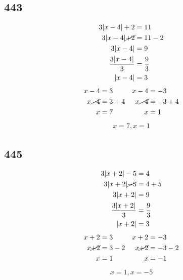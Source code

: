 \documentclass{article}
\begin{document}
    \subsection*{443}
    \begin{align*}
        3|x -4| +2 &= 11 \\
        3|x -4| \cancel{+2} &= 11 - 2 \\
        3|x -4|  &= 9 \\
        \frac{3|x -4|}{3}  &= \frac{9}{3} \\
        |x - 4| &= 3
    \end{align*}
    \begin{align*}
        x - 4 &= 3 &x -4 &= -3\\
        x \cancel{- 4} &= 3 +4 &x \cancel{-4} &= -3 +4\\
        x  &=  7 &x  &= 1\\
    \end{align*}
    \begin{align*}
        \boxed{x = 7, x = 1}
    \end{align*}

    \subsection*{445}
    \begin{align*}
        3|x +2| -5 &= 4 \\
        3|x +2| \cancel{-5} &= 4 + 5 \\
        3|x +2|  &= 9 \\
        \frac{3|x +2|}{3}  &= \frac{9}{3} \\
        |x +2| &= 3
    \end{align*}
    \begin{align*}
        x + 2 &= 3 &x +2 &= -3\\
        x \cancel{+2} &= 3 -2 &x \cancel{+2} &= -3 -2\\
        x  &=  1 &x  &= -1\\
    \end{align*}
    \begin{align*}
        \boxed{x = 1, x = -5}
    \end{align*}
\end{document}
